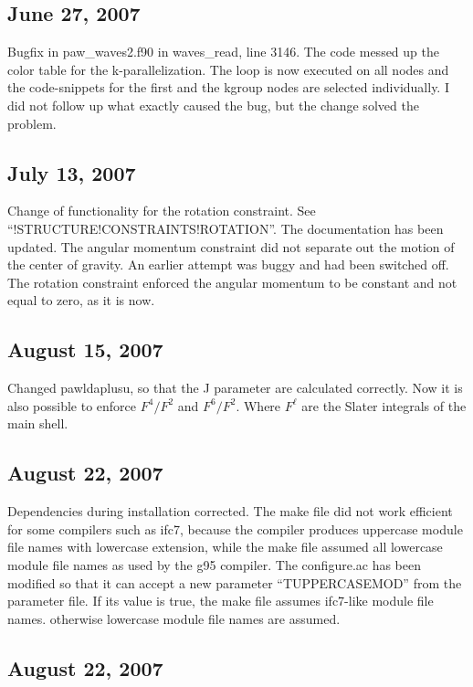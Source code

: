 \documentclass[final,12pt]{article}
\begin{document}
\subsection{June 27,  2007}

Bugfix in paw\_waves2.f90 in waves\_read, line 3146. The code messed up
the color table for the k-parallelization. The loop is now executed on
all nodes and the code-snippets for the first and the kgroup nodes are
selected individually. I did not follow up what exactly caused the
bug, but the change solved the problem.

\subsection{July 13,  2007}

Change of functionality for the rotation constraint. See
``!STRUCTURE!CONSTRAINTS!ROTATION''.  The documentation has been
updated. The angular momentum constraint did not separate out the
motion of the center of gravity. An earlier attempt was buggy and had
been switched off. The rotation constraint enforced the angular
momentum to be constant and not equal to zero, as it is now.

\subsection{August 15,  2007}

Changed pawldaplusu, so that the J parameter are calculated correctly.
Now it is also possible to enforce $F^4/F^2$ and $F^6/F^2$. Where
$F^\ell$ are the Slater integrals of the main shell.

\subsection{August 22,  2007}

Dependencies during installation corrected. The make file did not work
efficient for some compilers such as ifc7, because the compiler
produces uppercase module file names with lowercase extension, while
the make file assumed all lowercase module file names as used by the
g95 compiler. The configure.ac has been modified so that it can accept
a new parameter ``TUPPERCASEMOD'' from the parameter file. If its
value is true, the make file assumes ifc7-like module file names.
otherwise lowercase module file names are assumed.

\subsection{August 22,  2007}
\end{document}
